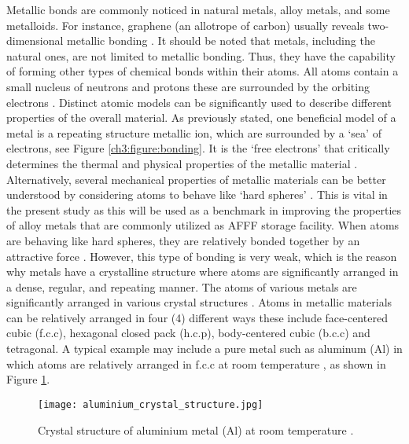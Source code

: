 Metallic bonds are commonly noticed in natural metals, alloy metals, and some metalloids. For instance, graphene (an allotrope of carbon) usually reveals two-dimensional metallic bonding \cite{lepetit2017topological}. It should be noted that metals, including the natural ones, are not limited to metallic bonding. Thus, they have the capability of forming other types of chemical bonds within their atoms.
All atoms contain a small nucleus of neutrons and protons these are surrounded by the orbiting electrons \cite{hench2005biomaterials}. Distinct atomic models can be significantly used to describe different properties of the overall material. As previously stated, one beneficial model of a metal is a repeating structure metallic ion, which are surrounded by a ‘sea’ of electrons, see Figure \ref{ch3:figure:bonding}. It is the ‘free electrons’ that critically determines the thermal and physical properties of the metallic material \cite{hench2005biomaterials}. Alternatively, several mechanical properties of metallic materials can be better understood by considering atoms to behave like ‘hard spheres’ \cite{hench2005biomaterials}. This is vital in the present study as this will be used as a benchmark in improving the properties of alloy metals that are commonly utilized as AFFF storage facility.
When atoms are behaving like hard spheres, they are relatively bonded together by an attractive force \cite{lepetit2017topological}. However, this type of bonding is very weak, which is the reason why metals have a crystalline structure where atoms are significantly arranged in a dense, regular, and repeating manner. The atoms of various metals are significantly arranged in various crystal structures \cite{hench2005biomaterials}. Atoms in metallic materials can be relatively arranged in four (4) different ways these include face-centered cubic (f.c.c), hexagonal closed pack (h.c.p), body-centered cubic (b.c.c) and tetragonal. A typical example may include a pure metal such as aluminum (Al) in which atoms are relatively arranged in f.c.c at room temperature \cite{hench2005biomaterials}, as shown in Figure \ref{ch3:figure:aluminium}.
 
\begin{figure}[H]
    \centering
    \texttt{[image: aluminium\_crystal\_structure.jpg]}
    \caption{Crystal structure of aluminium metal (Al) at room temperature \cite{hench2005biomaterials}.}
    \label{ch3:figure:aluminium}
\end{figure}

